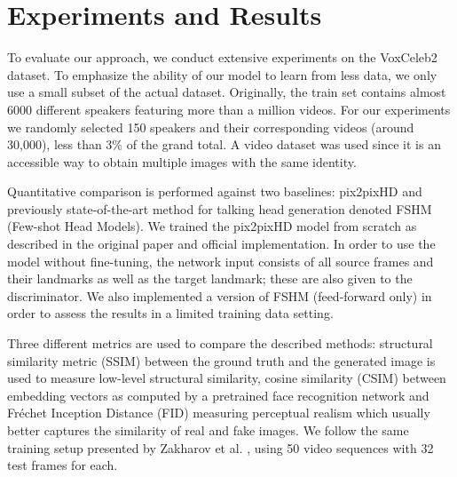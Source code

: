 \documentclass[11pt,a4paper]{article}
\begin{document}
\section{Experiments and Results}
\label{sec:experiments}

To evaluate our approach, we conduct extensive experiments on the VoxCeleb2 \cite{Chung18b} dataset. To emphasize the ability of our model to learn from less data, we only use a small subset of the actual dataset. Originally, the train set contains almost 6000 different speakers featuring more than a million videos. For our experiments we randomly selected 150 speakers and their corresponding videos (around 30,000), less than 3\% of the grand total. A video dataset was used since it is an accessible way to obtain multiple images with the same identity.

Quantitative comparison is performed against two baselines: pix2pixHD \cite{wang2018pix2pixHD} and previously state-of-the-art method for talking head generation \cite{zakharov2019fewshot} denoted FSHM (Few-shot Head Models). We trained the pix2pixHD model from scratch as described in the original paper and official implementation. In order to use the model without fine-tuning, the network input consists of all source frames and their landmarks as well as the target landmark; these are also given to the discriminator. We also implemented a version of FSHM (feed-forward only) in order to assess the results in a limited training data setting. 

Three different metrics are used to compare the described methods: structural similarity metric (SSIM) between the ground truth and the generated image is used to measure low-level structural similarity, cosine similarity (CSIM) between embedding vectors as computed by a pretrained face recognition network and Fr\'echet Inception Distance (FID) \cite{heusel2017gans} measuring perceptual realism which usually better captures the similarity of real and fake images. We follow the same training setup presented by Zakharov et al. \cite{zakharov2019fewshot}, using 50 video sequences with 32 test frames for each. 
\end{document}
